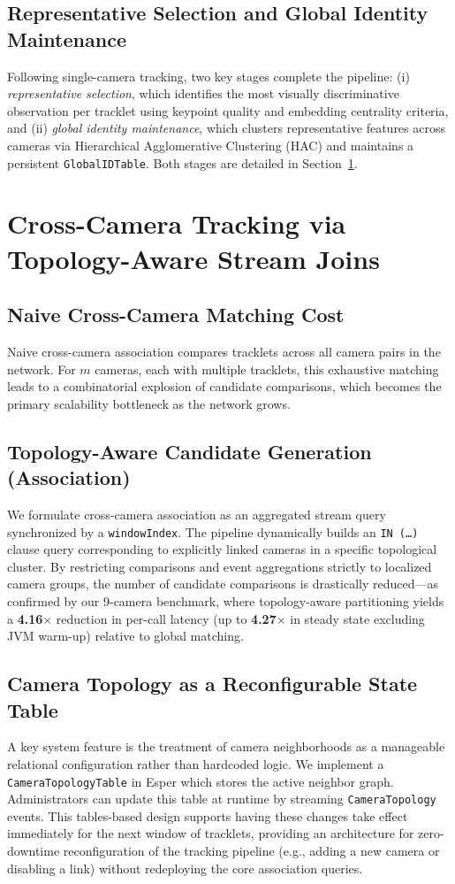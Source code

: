 \documentclass[11pt]{article}
\begin{document}
\subsection{Representative Selection and Global Identity Maintenance}
Following single-camera tracking, two key stages complete the pipeline: (i) \emph{representative selection}, which identifies the most visually discriminative observation per tracklet using keypoint quality and embedding centrality criteria, and (ii) \emph{global identity maintenance}, which clusters representative features across cameras via Hierarchical Agglomerative Clustering (HAC) and maintains a persistent \texttt{GlobalIDTable}. Both stages are detailed in Section~\ref{sec:joins}.

\section{Cross-Camera Tracking via Topology-Aware Stream Joins}\label{sec:joins}
\subsection{Naive Cross-Camera Matching Cost}
Naive cross-camera association compares tracklets across all camera pairs in the network. For $m$ cameras, each with multiple tracklets, this exhaustive matching leads to a combinatorial explosion of candidate comparisons, which becomes the primary scalability bottleneck as the network grows.

\subsection{Topology-Aware Candidate Generation (Association)}
We formulate cross-camera association as an aggregated stream query synchronized by a \texttt{windowIndex}. The pipeline dynamically builds an \texttt{IN (\dots)} clause query corresponding to explicitly linked cameras in a specific topological cluster. By restricting comparisons and event aggregations strictly to localized camera groups, the number of candidate comparisons is drastically reduced---as confirmed by our 9-camera benchmark, where topology-aware partitioning yields a \textbf{4.16$\times$} reduction in per-call latency (up to \textbf{4.27$\times$} in steady state excluding JVM warm-up) relative to global matching.

\subsection{Camera Topology as a Reconfigurable State Table}
A key system feature is the treatment of camera neighborhoods as a manageable relational configuration rather than hardcoded logic. We implement a \texttt{CameraTopologyTable} in Esper which stores the active neighbor graph. Administrators can update this table at runtime by streaming \texttt{CameraTopology} events. This tables-based design supports having these changes take effect immediately for the next window of tracklets, providing an architecture for zero-downtime reconfiguration of the tracking pipeline (e.g., adding a new camera or disabling a link) without redeploying the core association queries.
\end{document}
